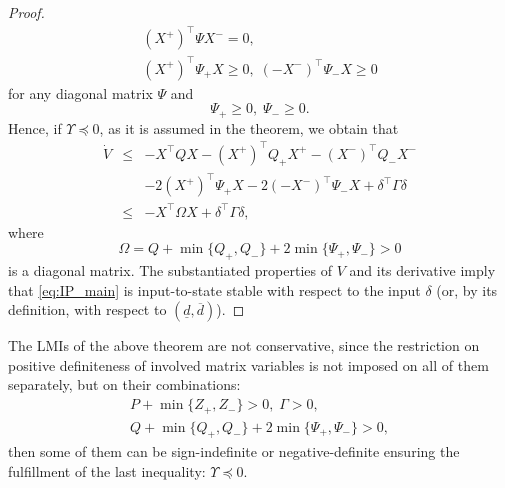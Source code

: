 \begin{proof}
\begin{gather*}
	(X^{+})^{\top}\Psi X^{-}=0,\\
	(X^{+})^{\top}\Psi_{+}X\geq0,\;(-X^{-})^{\top}\Psi_{-}X\geq0
	\end{gather*}
	for any diagonal matrix $\Psi$ and
	\[
	\Psi_{+}\geq0,\;\Psi_{-}\geq0.
	\]
	Hence, if $\Upsilon\preceq0$, as it is assumed in the theorem, we obtain that
	\begin{eqnarray*}
		\dot{V} & \leq & -X^{\top}QX-(X^{+})^{\top}Q_{+}X^{+}-(X^{-})^{\top}Q_{-}X^{-}\\
		&  & -2(X^{+})^{\top}\Psi_{+}X-2(-X^{-})^{\top}\Psi_{-}X+\delta^{\top}\Gamma\delta\\
		& \leq & -X^{\top}\Omega X+\delta^{\top}\Gamma\delta,
	\end{eqnarray*}
	where
	\[
	\Omega=Q+\min\{Q_{+},Q_{-}\}+2\min\{\Psi_{+},\Psi_{-}\}>0
	\]
	is a diagonal matrix. The substantiated properties of $V$ and its derivative imply that \eqref{eq:IP_main} is input-to-state stable \cite{Khalil2002} with respect to the input $\delta$ (or, by its definition, with respect to $(\underline{d},\overline{d})$).
\end{proof}
\begin{remark}
	The LMIs of the above theorem are not conservative, since the restriction on positive definiteness of involved matrix variables is not imposed on all of them separately, but on their combinations:
	\begin{gather*}
	P+\min\{Z_{+},Z_{-}\}>0,\;\Gamma>0,\\
	Q+\min\{Q_{+},Q_{-}\}+2\min\{\Psi_{+},\Psi_{-}\}>0,
	\end{gather*}
	then some of them can be sign-indefinite or negative-definite ensuring the fulfillment of the last inequality:
	$
	\Upsilon\preceq0.
	$
\end{remark}


